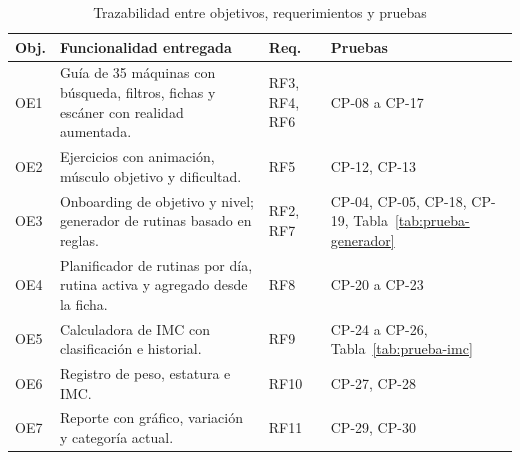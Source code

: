 \begin{table}[H]
\centering
\caption{Trazabilidad entre objetivos, requerimientos y pruebas}
\label{tab:trazabilidad}
\begin{tabularx}{\textwidth}{|L{1.1cm}|Y|L{1.9cm}|L{2.9cm}|}
\hline
{} \textbf{Obj.} & \textbf{Funcionalidad entregada} & \textbf{Req.} &
\textbf{Pruebas} \\
\hline
OE1 & Guía de 35 máquinas con búsqueda, filtros, fichas y escáner con
realidad aumentada. & RF3, RF4, RF6 & CP-08 a CP-17 \\ \hline
OE2 & Ejercicios con animación, músculo objetivo y dificultad. & RF5 &
CP-12, CP-13 \\ \hline
OE3 & Onboarding de objetivo y nivel; generador de rutinas basado en
reglas. & RF2, RF7 & CP-04, CP-05, CP-18, CP-19, Tabla~\ref{tab:prueba-generador} \\ \hline
OE4 & Planificador de rutinas por día, rutina activa y agregado desde la
ficha. & RF8 & CP-20 a CP-23 \\ \hline
OE5 & Calculadora de IMC con clasificación e historial. & RF9 & CP-24 a
CP-26, Tabla~\ref{tab:prueba-imc} \\ \hline
OE6 & Registro de peso, estatura e IMC. & RF10 & CP-27, CP-28 \\ \hline
OE7 & Reporte con gráfico, variación y categoría actual. & RF11 & CP-29,
CP-30 \\
\hline
\end{tabularx}
\end{table}

